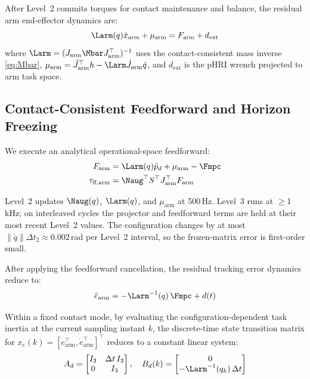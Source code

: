 After Level~2 commits torques for contact maintenance and balance, the
residual arm end-effector dynamics are:
\begin{equation}\label{eq:plant}
  \Larm(q)\ddot{x}_{\text{arm}}+\mu_{\text{arm}} = F_{\text{arm}}+d_{\text{ext}}
\end{equation}
where $\Larm=(J_{\text{arm}}\Mbar J_{\text{arm}}^\top)^{-1}$ uses the
contact-consistent mass inverse \eqref{eq:Mbar},
$\mu_{\text{arm}}=\bar{J}_{\text{arm}}^\top h - \Larm\dot{J}_{\text{arm}}\dot{q}$,
and $d_{\text{ext}}$ is the pHRI wrench projected to arm task space.

\subsection{Contact-Consistent Feedforward and Horizon Freezing}

We execute an analytical operational-space feedforward:
\begin{subequations}\label{eq:feedforward}
\begin{align}
  F_{\text{arm}} &= \Larm(q)\ddot{p}_d + \mu_{\text{arm}} - \Fmpc \label{eq:ff_a}\\
  \tau_{\text{ff,arm}} &= \Naug^\top S^\top J_{\text{arm}}^\top F_{\text{arm}} \label{eq:ff_b}
\end{align}
\end{subequations}

Level~2 updates $\Naug(q)$, $\Larm(q)$, and $\mu_{\text{arm}}$ at 500\,Hz.
Level~3 runs at $\geq$1\,kHz; on interleaved cycles the projector and
feedforward terms are held at their most recent Level~2 values.
The configuration changes by at most $\|\dot{q}\|\Delta t_2\approx0.002$\,rad
per Level~2 interval, so the frozen-matrix error is first-order small.

After applying the feedforward cancellation, the residual tracking error
dynamics reduce to:
\begin{equation}\label{eq:errordyn}
  \ddot{e}_{\text{arm}} = -\Larm^{-1}(q)\,\Fmpc + d(t)
\end{equation}

\begin{proposition}
\label{prop:constant_Ad}
Within a fixed contact mode, by evaluating the configuration-dependent task
inertia at the current sampling instant $k$, the discrete-time state
transition matrix for $x_e(k)=[e_{\text{arm}}^\top,\dot{e}_{\text{arm}}^\top]^\top$
reduces to a constant linear system:
\begin{equation}\label{eq:Ad}
  A_d = \begin{bmatrix}I_3 & \Delta t\,I_3 \\ 0 & I_3\end{bmatrix},
  \quad
  B_d(k) = \begin{bmatrix}0 \\ -\Larm^{-1}(q_k)\,\Delta t\end{bmatrix}
\end{equation}
\end{proposition}

